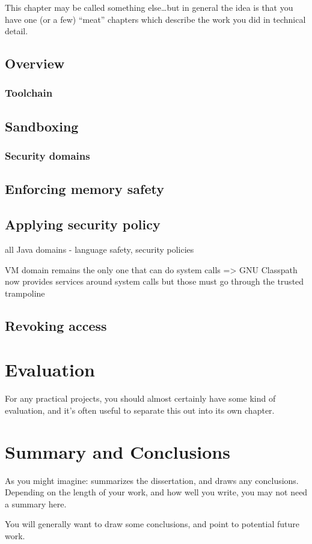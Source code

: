 \documentclass[a4paper,12pt,twoside,openright]{report}
\begin{document}
This chapter may be called something else\ldots but in general 
the idea is that you have one (or a few) ``meat'' chapters which
describe the work you did in technical detail. 

\section{Overview}

\subsection{Toolchain}

\section{Sandboxing}

\subsection{Security domains}

\section{Enforcing memory safety}

\section{Applying security policy}

all Java domains - language safety, security policies

VM domain remains the only one that can do system calls => GNU Classpath now provides services around system calls but those must go through the trusted trampoline

\section{Revoking access}

\chapter{Evaluation} 

For any practical projects, you should almost certainly have
some kind of evaluation, and it's often useful to separate 
this out into its own chapter. 


\chapter{Summary and Conclusions} 

As you might imagine: summarizes the dissertation, and draws 
any conclusions. Depending on the length of your work, and 
how well you write, you may not need a summary here. 

You will generally want to draw some conclusions, and point
to potential future work. 




\appendix
\singlespacing

 
 
\end{document}
